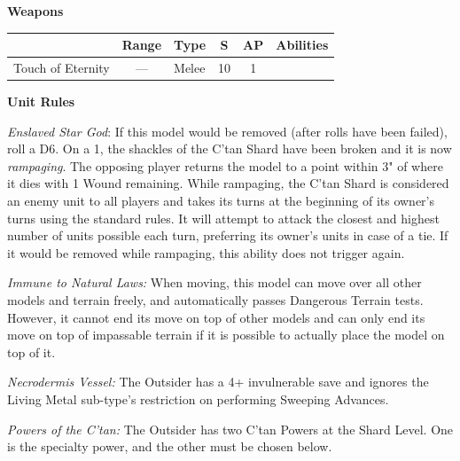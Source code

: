 \begin{minipage}[t]{0.72\textwidth}
	\vspace*{2em}
	\textbf{Weapons}
	
	\begin{tabular}{L{90 pt} c C{40pt} *{2}{c} >{\raggedright\arraybackslash}p{130pt}}
		& Range & Type & S & AP & Abilities \\
		\hline
		Touch of Eternity & — & Melee & 10 & 1 &  \\
	\end{tabular}
	
	\vspace*{2em}
	\textbf{Unit Rules}
	
	\textit{Enslaved Star God}: If this model would be removed (after  rolls have been failed), roll a D6. On a 1, the shackles of the C'tan Shard have been broken and it is now \textit{rampaging}. The opposing player returns the model to a point within 3" of where it dies with 1 Wound remaining. While rampaging, the C'tan Shard is considered an enemy unit to all players and takes its turns at the beginning of its owner's turns using the standard rules. It will attempt to attack the closest and highest number of units possible each turn, preferring its owner's units in case of a tie. If it would be removed while rampaging, this ability does not trigger again.
	
	\textit{Immune to Natural Laws:} When moving, this model can move over all other models and terrain freely, and automatically passes Dangerous Terrain tests. However, it cannot end its move on top of other models and can only end its move on top of impassable terrain if it is possible to actually place the model on top of it.
	
	\textit{Necrodermis Vessel:} The Outsider has a 4+ invulnerable save and ignores the Living Metal sub-type's restriction on performing Sweeping Advances.
		
	\textit{Powers of the C'tan:} The Outsider has two C'tan Powers at the Shard Level. One is the  specialty power, and the other must be chosen below.
		

\end{minipage}
